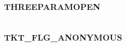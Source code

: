 \documentclass[letterpaper,10pt,english]{sphinxmanual}
\begin{document}
\begin{fulllineitems}
\label{appdev/refs/macros/SALT_TYPE_NO_LENGTH:SALT_TYPE_NO_LENGTH}
\end{fulllineitems}


\begin{tabulary}{\linewidth}{|L|L|}
\hline

 & 
\\\hline
\end{tabulary}



\subsubsection{THREEPARAMOPEN}
\label{appdev/refs/macros/THREEPARAMOPEN:threeparamopen}\label{appdev/refs/macros/THREEPARAMOPEN:threeparamopen-data}\label{appdev/refs/macros/THREEPARAMOPEN::doc}

\begin{fulllineitems}
\label{appdev/refs/macros/THREEPARAMOPEN:THREEPARAMOPEN}
\end{fulllineitems}


\begin{tabulary}{\linewidth}{|L|L|}
\hline

 & 
\\\hline
\end{tabulary}



\subsubsection{TKT\_FLG\_ANONYMOUS}
\label{appdev/refs/macros/TKT_FLG_ANONYMOUS::doc}\label{appdev/refs/macros/TKT_FLG_ANONYMOUS:tkt-flg-anonymous}\label{appdev/refs/macros/TKT_FLG_ANONYMOUS:tkt-flg-anonymous-data}

\begin{fulllineitems}
\label{appdev/refs/macros/TKT_FLG_ANONYMOUS:TKT_FLG_ANONYMOUS}
\end{fulllineitems}


\begin{tabulary}{\linewidth}{|L|L|}
\hline

 & 
\\\hline
\end{tabulary}
\end{document}
